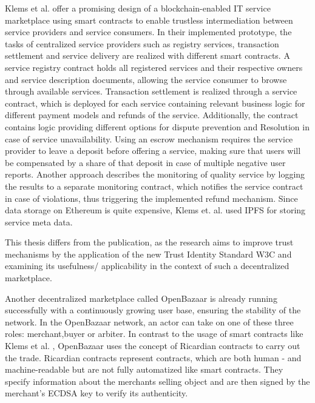 Klems et al. offer a promising design of a blockchain-enabled IT service marketplace using smart contracts to enable trustless intermediation between service providers and service consumers. In their implemented prototype, the tasks of centralized service providers such as registry services, transaction settlement and service delivery are realized with different smart contracts.
A service registry contract holds all registered services and their respective owners and service description documents, allowing the service consumer to browse through available services. Transaction settlement is realized through a service contract, which is deployed for each service containing relevant business logic for different payment models and refunds of the service. 
Additionally, the contract contains logic providing different options for dispute prevention and Resolution in case of service unavailability. Using an escrow mechanism requires the service provider to leave a deposit before offering a service, making sure that users will be compensated by a share of that deposit in case of multiple negative user reports. 
Another approach describes the monitoring of quality service by logging the results to a separate monitoring contract, which notifies the service contract in case of violations, thus triggering the implemented refund mechanism. 
Since data storage on Ethereum is quite expensive, Klems et. al. used IPFS for storing service meta data. 

This thesis differs from the publication, as the research aims to improve trust mechanisms by the application of the new Trust Identity Standard W3C and examining its usefulness/ applicability in the context of such a decentralized marketplace.  


Another decentralized marketplace called OpenBazaar is already running successfully with a continuously growing user base, ensuring the stability of the network. 
In the OpenBazaar network, an actor can take on one of these three roles:  merchant,buyer or arbiter. In contrast to the usage of smart contracts like Klems et al. , OpenBazaar uses the concept of Ricardian contracts to carry out the trade. 
Ricardian contracts represent contracts, which are both human - and machine-readable but are not fully automatized like smart contracts. They specify information about the merchants selling object and are then signed by the merchant's ECDSA key to verify its authenticity. 

